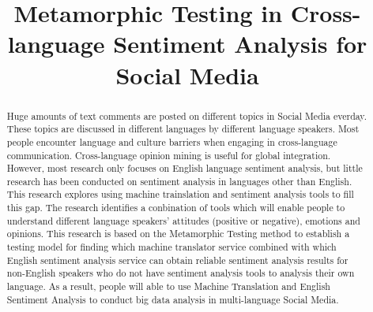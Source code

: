 \documentclass[conference]{IEEEtran}
\begin{document}
\title{\huge Metamorphic Testing in Cross-language Sentiment Analysis for Social Media}

\author{
\and
{}
\and
{}
\and
{}
}

\maketitle

\begin{abstract}
  Huge amounts of text comments are posted on different topics in Social
  Media everday. These topics are discussed in different languages by different language
  speakers. Most people encounter language and culture barriers when engaging in
  cross-language communication. Cross-language opinion
  mining is useful for global integration. However, most research only focuses on
  English language sentiment analysis, but little research has been conducted on
  sentiment analysis in languages other than English. This research explores using machine
  trainslation and sentiment analysis tools to fill this gap. The research
  identifies a conbination of tools which will enable people to understand different language speakers' attitudes (positive or negative),
  emotions and opinions. This research is  based on the Metamorphic Testing method to establish a
  testing model for finding which machine translator service combined with which
  English sentiment analysis service can obtain reliable sentiment analysis
  results for non-English speakers who do not have sentiment analysis tools to
  analysis their own language. As a result, people will able to use Machine Translation
  and English Sentiment Analysis to conduct big data analysis in multi-language Social Media.
\end{abstract}
\end{document}
